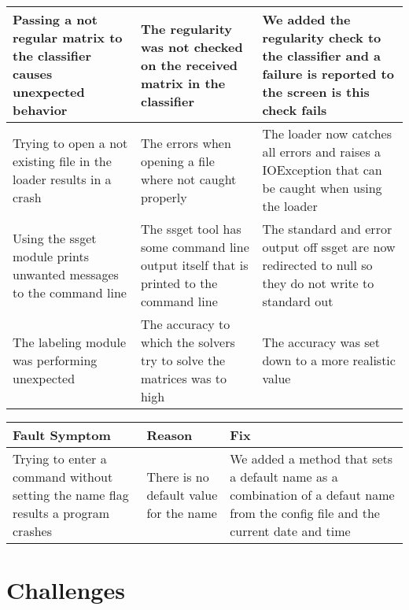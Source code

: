 \documentclass[parskip=full]{scrartcl}
\begin{document}
\begin{tabular}{|p{4.5cm}|p{4.5cm}|p{4.5cm}|}
\hline

Passing a not regular matrix to the classifier causes unexpected behavior &
The regularity was not checked on the received matrix in the classifier &
We added the regularity check to the classifier and a failure is reported to the screen is this check fails \\

\hline

Trying to open a not existing file in the loader results in a crash &
The errors when opening a file where not caught properly &
The loader now catches all errors and raises a IOException that can be caught when using the loader \\

\hline

Using the \gls{ssget} module prints unwanted messages to the command line &
The \gls{ssget} tool has some command line output itself that is printed to the command line &
The standard and error output off \gls{ssget} are now redirected to null so they do not write to standard out \\

\hline

The labeling module was performing unexpected &
The accuracy to which the solvers try to solve the matrices was to high &
The accuracy was set down to a more realistic value \\

\hline

\end{tabular}

\begin{tabular}{|p{4.5cm}|p{4.5cm}|p{4.5cm}|}

\hline

 Fault Symptom  & Reason & Fix  \\

\hline

Trying to enter a command without setting the name flag results a program crashes &
There is no default value for the name &
We added a method that sets a default name as a combination of a defaut name from the config file and the current date and time \\

\hline

\end{tabular}

\newpage

\section{Challenges}
\end{document}
